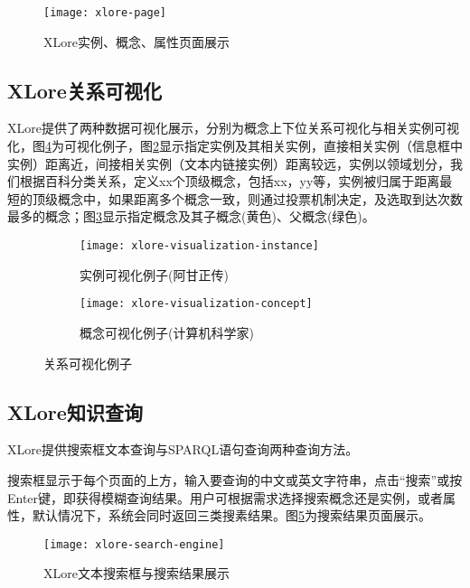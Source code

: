 \begin{figure}[H]
  \centering
  \texttt{[image: xlore-page]}
  \caption{XLore实例、概念、属性页面展示}
  \label{fig:xlore-page}
\end{figure}

\subsection{XLore关系可视化}

XLore提供了两种数据可视化展示，分别为概念上下位关系可视化与相关实例可视化，图\ref{fig:xlore-visualization}为可视化例子，图\ref{fig:xlore-visualization-instance}显示指定实例及其相关实例，直接相关实例（信息框中实例）距离近，间接相关实例（文本内链接实例）距离较远，实例以领域划分，我们根据百科分类关系，定义xx个顶级概念，包括xx，yy等，实例被归属于距离最短的顶级概念中，如果距离多个概念一致，则通过投票机制决定，及选取到达次数最多的概念；图\ref{fig:xlore-visualization-concept}显示指定概念及其子概念(黄色)、父概念(绿色)。

\begin{figure}[H]
  \centering
  \begin{subfigure}{7.2cm}
    \texttt{[image: xlore-visualization-instance]}
    \caption{实例可视化例子(阿甘正传)}
  \label{fig:xlore-visualization-instance}
  \end{subfigure}
  \hspace{0.01cm}%
  \begin{subfigure}{7.2cm}
    \texttt{[image: xlore-visualization-concept]}
    \caption{概念可视化例子(计算机科学家)}
  \label{fig:xlore-visualization-concept}
  \end{subfigure}
  \caption{关系可视化例子}
  \label{fig:xlore-visualization}
\end{figure}

\subsection{XLore知识查询}
XLore提供搜索框文本查询与SPARQL语句查询两种查询方法。

搜索框显示于每个页面的上方，输入要查询的中文或英文字符串，点击“搜索”或按Enter键，即获得模糊查询结果。用户可根据需求选择搜索概念还是实例，或者属性，默认情况下，系统会同时返回三类搜素结果。图\ref{fig:xlore-search-engine}为搜索结果页面展示。

\begin{figure}[H]
  \centering
  \texttt{[image: xlore-search-engine]}
  \caption{XLore文本搜索框与搜索结果展示}
  \label{fig:xlore-search-engine}
\end{figure}

